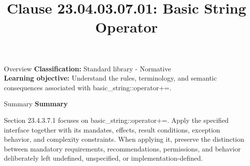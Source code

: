 \documentclass[10pt,letterpaper]{article}
\title{Clause 23.04.03.07.01: Basic String Operator}
\author{}
\date{}
\begin{document}
\maketitle
\begin{CornellOverviewBox}{Overview}
\textbf{Classification:} Standard library - Normative\\[2pt]
\textbf{Learning objective:} Understand the rules, terminology, and semantic consequences associated with basic\_string::operator+=.
\end{CornellOverviewBox}\begin{CornellSummaryBox}{Summary}
{\sffamily\bfseries\color{Accent} Summary}\par\vspace{3pt}Section 23.4.3.7.1 focuses on basic\_string::operator+=. Apply the specified interface together with its mandates, effects, result conditions, exception behavior, and complexity constraints. When applying it, preserve the distinction between mandatory requirements, recommendations, permissions, and behavior deliberately left undefined, unspecified, or implementation-defined.
\end{CornellSummaryBox}
\end{document}
